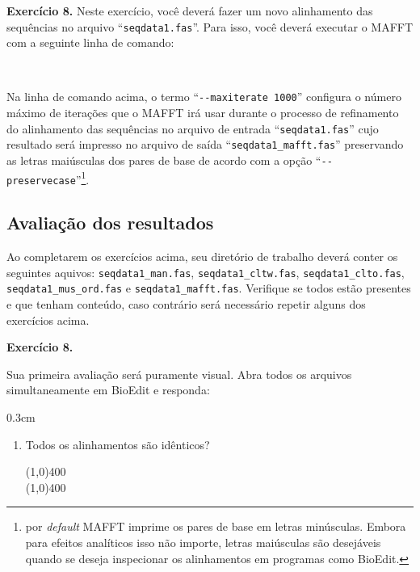 \begin{refsection}
\begin{blackBlock}{\textbf{Exercício 8.}}
Neste exercício, você deverá fazer um novo alinhamento das sequências no arquivo ``\texttt{seqdata1.fas}''. Para isso, você deverá executar o MAFFT com a seguinte linha de comando:

\scriptsize
{}\\
\normalsize

\end{blackBlock}

Na linha de comando acima, o termo ``\texttt{-{}-maxiterate 1000}'' configura o número máximo de iterações que o MAFFT irá usar durante o processo de refinamento do alinhamento das sequências no arquivo de entrada ``\texttt{seqdata1.fas}'' cujo resultado será impresso no arquivo de saída ``\texttt{seqdata1\_mafft.fas}'' preservando as letras maiúsculas dos pares de base de acordo com a opção ``\texttt{-{}-preservecase}''\footnote{ por \textit{default} MAFFT imprime os pares de base em letras minúsculas. Embora para efeitos analíticos isso não importe, letras maiúsculas são desejáveis quando se deseja inspecionar os alinhamentos em programas como BioEdit.}.


\subsection{Avaliação dos resultados}\label{tut8:msa:results}

Ao completarem os exercícios acima, seu diretório de trabalho deverá conter os seguintes aquivos: \texttt{seqdata1\_man.fas}, \texttt{seqdata1\_cltw.fas}, \texttt{seqdata1\_clto.fas}, \texttt{seqdata1\_mus\_ord.fas} e \texttt{seqdata1\_mafft.fas}. Verifique se todos estão presentes e que tenham conteúdo, caso contrário será necessário repetir alguns dos exercícios acima.


\begin{blackBlock}{\textbf{Exercício 8.}}\label{tut8:ex:8.6}

Sua primeira avaliação será puramente visual. Abra todos os arquivos simultaneamente em BioEdit e responda:

\end{blackBlock}


\begin {myindentpar}{0.3cm}
\begin{enumerate}[\itshape i.]
	\item{Todos os alinhamentos são idênticos?}

\line(1,0){400}\\
\line(1,0){400}\\


\end{enumerate}
\end{myindentpar}
\end{refsection}
